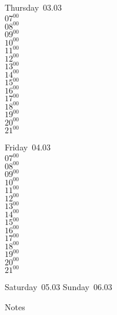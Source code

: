 \documentclass[11pt,a4paper]{book}\usepackage[]{graphicx}\usepackage[]{color}
\begin{document}
\clearpage
\begin{headerbox}
\end{headerbox}
\begin{weekdaybox}
  Thursday~03.03\\
  { 
  \vfill
  $07^{00}$\\
$08^{00}$\\
$09^{00}$\\
$10^{00}$\\
$11^{00}$\\
$12^{00}$\\
$13^{00}$\\
$14^{00}$\\
$15^{00}$\\
$16^{00}$\\
$17^{00}$\\
$18^{00}$\\
$19^{00}$\\
$20^{00}$\\
$21^{00}$\\
  }
\end{weekdaybox} 
\begin{weekdaybox}
  Friday~04.03\\
  { 
  \vfill
  $07^{00}$\\
$08^{00}$\\
$09^{00}$\\
$10^{00}$\\
$11^{00}$\\
$12^{00}$\\
$13^{00}$\\
$14^{00}$\\
$15^{00}$\\
$16^{00}$\\
$17^{00}$\\
$18^{00}$\\
$19^{00}$\\
$20^{00}$\\
$21^{00}$\\
  }
\end{weekdaybox}
\begin{weekendbox}
  Saturday~05.03
  \tcblower
  Sunday~06.03
\end{weekendbox} %
\begin{notebox}
  Notes
\end{notebox}
\clearpage
\end{document}
